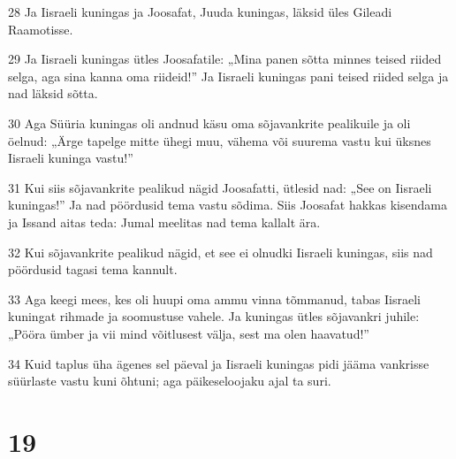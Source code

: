 \par 28 Ja Iisraeli kuningas ja Joosafat, Juuda kuningas, läksid üles Gileadi Raamotisse.
\par 29 Ja Iisraeli kuningas ütles Joosafatile: „Mina panen sõtta minnes teised riided selga, aga sina kanna oma riideid!” Ja Iisraeli kuningas pani teised riided selga ja nad läksid sõtta.
\par 30 Aga Süüria kuningas oli andnud käsu oma sõjavankrite pealikuile ja oli öelnud: „Ärge tapelge mitte ühegi muu, vähema või suurema vastu kui üksnes Iisraeli kuninga vastu!”
\par 31 Kui siis sõjavankrite pealikud nägid Joosafatti, ütlesid nad: „See on Iisraeli kuningas!” Ja nad pöördusid tema vastu sõdima. Siis Joosafat hakkas kisendama ja Issand aitas teda: Jumal meelitas nad tema kallalt ära.
\par 32 Kui sõjavankrite pealikud nägid, et see ei olnudki Iisraeli kuningas, siis nad pöördusid tagasi tema kannult.
\par 33 Aga keegi mees, kes oli huupi oma ammu vinna tõmmanud, tabas Iisraeli kuningat rihmade ja soomustuse vahele. Ja kuningas ütles sõjavankri juhile: „Pööra ümber ja vii mind võitlusest välja, sest ma olen haavatud!”
\par 34 Kuid taplus üha ägenes sel päeval ja Iisraeli kuningas pidi jääma vankrisse süürlaste vastu kuni õhtuni; aga päikeseloojaku ajal ta suri.

\chapter{19}

